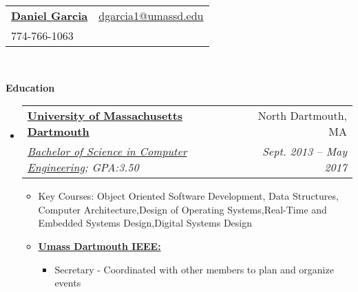 \documentclass[letterpaper,11pt]{article}
\makeatletter
\newcommand{\resitem}[1]{\item #1 \vspace{-2pt}}
\newcommand{\resheading}[1]{{\large \colorbox{mygrey}{\begin{minipage}{\textwidth}{\textbf{#1 \vphantom{p\^{E}}}}\end{minipage}}}}
\newcommand{\ressubheading}[4]{
\begin{tabular*}{6.5in}{l@{\extracolsep{\fill}}r}
		\textbf{#1} & #2 \\
		\textit{#3} & \textit{#4} \\
\end{tabular*}\vspace{-6pt}}
\makeatother
\begin{document}
\newcommand{\mywebheader}{
\begin{tabular*}{7in}{l@{\extracolsep{\fill}}r}
	\textbf{\href{http://www.DanGarcia.me/}{\LARGE Daniel Garcia}} & \href{mailto:dgarcia1@umassd.edu}{dgarcia1@umassd.edu}\\
    {774-766-1063}
	\end{tabular*}
\\
\vspace{0.1in}}

\mywebheader

\resheading{Education}
	\begin{itemize}
		\item
			\ressubheading{\href{http://www.umassd.edu}{University of Massachusetts Dartmouth}}{North Dartmouth, MA}{\href{http://www.umassd.edu/engineering/ece/}{Bachelor of Science in Computer Engineering}; {GPA:3.50}}{Sept. 2013 -- May 2017}
				{ \footnotesize
				\begin{itemize}
					\resitem{Key Courses: Object Oriented Software Development, Data Structures, {Computer Architecture},{Design of Operating Systems},{Real-Time and Embedded Systems Design},{Digital Systems Design}}
					\resitem{\textbf{\href{http://www1.umassd.edu/engineering/clubs/ieee/welcome.cfm}{Umass Dartmouth IEEE:}}} 
						\begin{itemize}
							\resitem{Secretary - Coordinated with other members to plan and organize events}
						\end{itemize}
				\end{itemize}
				}
\begin{comment}
		\item
			\ressubheading{\href{http://bcc.billings.k12.mt.us/}{Billings Career Center}}{Billings, MT}{\href{http://www.cisco.com/web/learning/netacad/index.html}{Cisco Networking Academy}; GPA:3.33}{Aug. 2002 - May 2003}
				{ \footnotesize
				\begin{itemize}
				\resitem{Graduated \href{http://www.cisco.com/web/learning/netacad/index.html}{Cisco Semester Four} comprising of coursework in networking infrastructures including LAN and WAN design and implementation}
				\end{itemize}
				}
\end{comment}
	\end{itemize} %
\end{document}
